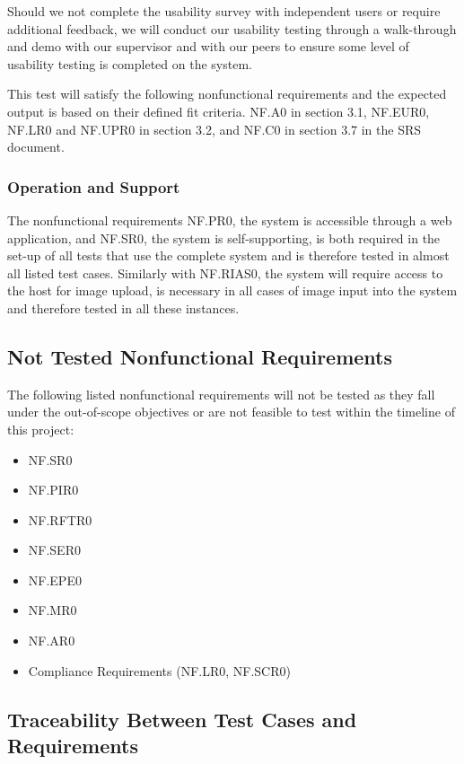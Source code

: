 \documentclass[12pt, titlepage]{article}
\begin{document}
Should we not complete the usability survey with independent users or require additional feedback, we will conduct our usability testing through a walk-through and demo with our supervisor and with our peers to ensure some level of usability testing is completed on the system.  

This test will satisfy the following nonfunctional requirements and the expected output is based on their defined fit criteria. NF.A0 in section 3.1, NF.EUR0, NF.LR0 and NF.UPR0 in section 3.2, and NF.C0 in section 3.7 in the SRS document.

\subsubsection{Operation and Support}
\noindent The nonfunctional requirements NF.PR0, the system is accessible through a web application, and NF.SR0, the system is self-supporting, is both required in the set-up of all tests that use the complete system and is therefore tested in almost all listed test cases. Similarly with NF.RIAS0, the system will require access to the host for image upload, is necessary in all cases of image input into the system and therefore tested in all these instances. 

\subsection{Not Tested Nonfunctional Requirements}
The following listed nonfunctional requirements will not be tested as they fall under the out-of-scope objectives or are not feasible to test within the timeline of this project:
\begin{itemize}
    \item NF.SR0
    \item NF.PIR0
    \item NF.RFTR0
    \item NF.SER0
    \item NF.EPE0
    \item NF.MR0
    \item NF.AR0
    \item Compliance Requirements (NF.LR0, NF.SCR0)
\end{itemize}

\newpage

\subsection{Traceability Between Test Cases and Requirements}
\end{document}
